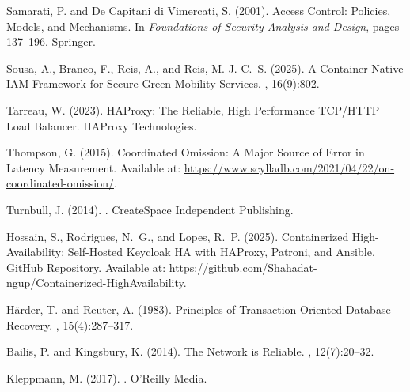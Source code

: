 \documentclass[a4paper,twoside]{article}
\begin{document}
\begin{thebibliography}{}
Samarati, P. and De Capitani di Vimercati, S. (2001).
\newblock Access Control: Policies, Models, and Mechanisms.
\newblock In {\em Foundations of Security Analysis and Design}, pages 137--196. Springer.

Sousa, A., Branco, F., Reis, A., and Reis, M. J. C.~S. (2025).
\newblock A Container-Native IAM Framework for Secure Green Mobility Services.
, 16(9):802.

Tarreau, W. (2023).
\newblock HAProxy: The Reliable, High Performance TCP/HTTP Load Balancer.
\newblock HAProxy Technologies.

Thompson, G. (2015).
\newblock Coordinated Omission: A Major Source of Error in Latency Measurement.
\newblock Available at: \url{https://www.scylladb.com/2021/04/22/on-coordinated-omission/}.

Turnbull, J. (2014).
.
\newblock CreateSpace Independent Publishing.

Hossain, S., Rodrigues, N.~G., and Lopes, R.~P. (2025).
\newblock Containerized High-Availability: Self-Hosted Keycloak HA with HAProxy, Patroni, and Ansible.
\newblock GitHub Repository.
\newblock Available at: \url{https://github.com/Shahadat-ngup/Containerized-HighAvailability}.

H\"{a}rder, T. and Reuter, A. (1983).
\newblock Principles of Transaction-Oriented Database Recovery.
, 15(4):287--317.

Bailis, P. and Kingsbury, K. (2014).
\newblock The Network is Reliable.
, 12(7):20--32.

Kleppmann, M. (2017).
.
\newblock O'Reilly Media.

\end{thebibliography}
\end{document}
